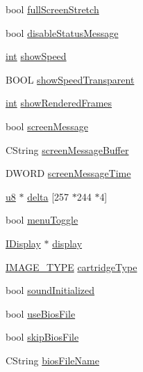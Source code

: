 \begin{DoxyCompactItemize}
\item 
bool \mbox{\hyperlink{class_v_b_a_a00bd5b85110bd763ad39eb4a9fb403a1}{full\+Screen\+Stretch}}
\item 
bool \mbox{\hyperlink{class_v_b_a_a7bfea5ab60b19d26053b22ce070e2248}{disable\+Status\+Message}}
\item 
\mbox{\hyperlink{_util_8cpp_a0ef32aa8672df19503a49fab2d0c8071}{int}} \mbox{\hyperlink{class_v_b_a_ad86589d0d03fceef36d35c0b2e928e9e}{show\+Speed}}
\item 
B\+O\+OL \mbox{\hyperlink{class_v_b_a_a0a2ca5a7091f9c79b39ea0916dd88a05}{show\+Speed\+Transparent}}
\item 
\mbox{\hyperlink{_util_8cpp_a0ef32aa8672df19503a49fab2d0c8071}{int}} \mbox{\hyperlink{class_v_b_a_a2d041dae40bdb47cd6bd28463cc484d9}{show\+Rendered\+Frames}}
\item 
bool \mbox{\hyperlink{class_v_b_a_a204d14d33aebd442db9affee1cc4f3a8}{screen\+Message}}
\item 
C\+String \mbox{\hyperlink{class_v_b_a_ab9551bfe042a30531aeb47a7b2ac2038}{screen\+Message\+Buffer}}
\item 
D\+W\+O\+RD \mbox{\hyperlink{class_v_b_a_a27f8c0f4add5a8242470289874dd601c}{screen\+Message\+Time}}
\item 
\mbox{\hyperlink{_system_8h_aed742c436da53c1080638ce6ef7d13de}{u8}} $\ast$ \mbox{\hyperlink{class_v_b_a_ae53d4a6574bd47657fa6bd76eabd8543}{delta}} \mbox{[}257 $\ast$244 $\ast$4\mbox{]}
\item 
bool \mbox{\hyperlink{class_v_b_a_a0bacc38e144832326c5d4d6df6ababa3}{menu\+Toggle}}
\item 
\mbox{\hyperlink{class_i_display}{I\+Display}} $\ast$ \mbox{\hyperlink{class_v_b_a_a940e5bad8b3ed2436888dbcd03bfd563}{display}}
\item 
\mbox{\hyperlink{_util_8h_aef8b88d56fdf9a25f990a68d80c014d8}{I\+M\+A\+G\+E\+\_\+\+T\+Y\+PE}} \mbox{\hyperlink{class_v_b_a_af300759fcbc7eeb00ce73f956fc5ddb7}{cartridge\+Type}}
\item 
bool \mbox{\hyperlink{class_v_b_a_ab183a69bf3da1ebd78a3dc115071e592}{sound\+Initialized}}
\item 
bool \mbox{\hyperlink{class_v_b_a_a0ad579388cd52cc4df5fadc560f27a37}{use\+Bios\+File}}
\item 
bool \mbox{\hyperlink{class_v_b_a_a5cb340a521f9f53bf082a63b26fbda25}{skip\+Bios\+File}}
\item 
C\+String \mbox{\hyperlink{class_v_b_a_a7bc70f5f75c0e2e3e2b1b63411af4559}{bios\+File\+Name}}
\item 

\end{DoxyCompactItemize}
